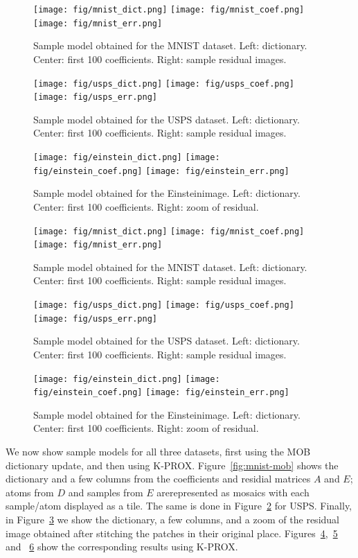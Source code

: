 \documentclass[twocolumn]{IEEEtran}
\theoremstyle{definition}
\begin{document}
\begin{figure}
\texttt{[image: fig/mnist\_dict.png]}
\texttt{[image: fig/mnist\_coef.png]}
\texttt{[image: fig/mnist\_err.png]}
\caption{\label{fig:mnist-mod} Sample model obtained for the MNIST dataset. Left: dictionary. Center: first 100 coefficients. Right: sample residual images. }
\end{figure}
%
\begin{figure}
\texttt{[image: fig/usps\_dict.png]}
\texttt{[image: fig/usps\_coef.png]}
\texttt{[image: fig/usps\_err.png]}
\caption{\label{fig:usps-mob} Sample model obtained for the USPS dataset. Left: dictionary. Center: first 100 coefficients. Right: sample residual images. }
\end{figure}
%
\begin{figure}
\texttt{[image: fig/einstein\_dict.png]}
\texttt{[image: fig/einstein\_coef.png]}
\texttt{[image: fig/einstein\_err.png]}
\caption{\label{fig:einstein-mob} Sample model obtained for the Einsteinimage. Left: dictionary. Center: first 100 coefficients. Right: zoom of residual. }
\end{figure}
%
\begin{figure}
\texttt{[image: fig/mnist\_dict.png]}
\texttt{[image: fig/mnist\_coef.png]}
\texttt{[image: fig/mnist\_err.png]}
\caption{\label{fig:mnist-kprox} Sample model obtained for the MNIST dataset. Left: dictionary. Center: first 100 coefficients. Right: sample residual images. }
\end{figure}
%
\begin{figure}
\texttt{[image: fig/usps\_dict.png]}
\texttt{[image: fig/usps\_coef.png]}
\texttt{[image: fig/usps\_err.png]}
\caption{\label{fig:usps-kprox} Sample model obtained for the USPS dataset. Left: dictionary. Center: first 100 coefficients. Right: sample residual images. }
\end{figure}
%
\begin{figure}
\texttt{[image: fig/einstein\_dict.png]}
\texttt{[image: fig/einstein\_coef.png]}
\texttt{[image: fig/einstein\_err.png]}
\caption{\label{fig:einstein-kprox} Sample model obtained for the Einsteinimage. Left: dictionary. Center: first 100 coefficients. Right: zoom of residual. }
\end{figure}
%

We now show sample models for all three datasets, first using the MOB dictionary update, and then using K-PROX. Figure~\ref{fig:mnist-mob} shows the dictionary and a few columns from the coefficients and residial matrices $A$ and $E$; atoms from $D$ and samples from $E$ arerepresented as mosaics with each sample/atom displayed as a tile. The same is done in Figure~\ref{fig:usps-mob} for USPS. Finally, in Figure~\ref{fig:einstein-mob} we show the dictionary, a few columns, and a zoom of the residual image obtained after stitching the patches in their original place. Figures~\ref{fig:mnist-kprox},~\ref{fig:usps-kprox} and ~\ref{fig:einstein-kprox} show the corresponding results using K-PROX.
\end{document}
